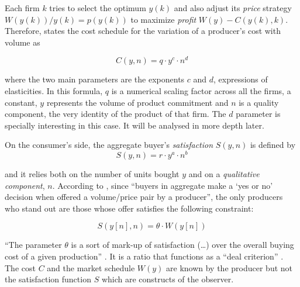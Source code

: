 \documentclass[a4paper, 12pt, openright, oneside, german, french, brazil, english]{abntex2}
\begin{document}
	Each firm $k$ tries to select the optimum $y(k)$ and also adjust its \textit{price} strategy 
	$ W(y(k))/y(k) = p(y(k)) $
	to maximize \textit{profit}
	$ W(y) - C(y(k), k) $. Therefore,  states the cost schedule for the variation of a producer's cost with volume as
	
	\begin{equation}
	\label{cost}
		C(y, n) = q \cdot y^c \cdot n^d
	\end{equation}
	
	where the two main parameters are the exponents $c$ and $d$, expressions of elasticities. In this formula, $q$ is a numerical scaling factor across all the firms, a constant, $y$ represents the volume of product commitment and $n$ is a quality component, the very identity of the product of that firm. The $d$ parameter is specially interesting in this case. It will be analysed in more depth later.
	
	On the consumer's side, the aggregate buyer's \textit{satisfaction} $ S(y, n) $ is defined by 
	\begin{equation}
	\label{satisfaction}
		S(y, n) = r \cdot y^a \cdot n^b 	
	\end{equation}
		
	and it relies both on the number of units bought $y$ and on a \textit{qualitative component}, $n$. According to , since ``buyers in aggregate make a `yes or no' decision when offered a volume/price pair by a producer'', the only producers who stand out are those whose offer satisfies the following constraint:
	
	\begin{equation}
	\label{S-theta}
		S(y[n], n) = \theta \cdot W(y[n])	
	\end{equation}

	
	``The parameter $\theta$ is a sort of mark-up of satisfaction (\dots) over the overall buying cost of a given production'' \cite[p. 217]{favereau2002markets}. It is a ratio that functions as a ``deal criterion'' \cite[p. 39]{white2002markets}. The cost $C$ and the market schedule $W(y)$ are known by the producer but not the satisfaction function $S$ which are constructs of the observer.
	
	
\end{document}
